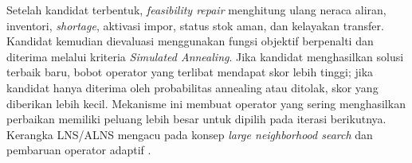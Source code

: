 \documentclass[journal]{IEEEtran}
\theoremstyle{definition}
\theoremstyle{definition}
\theoremstyle{plain}
\begin{document}
    \begin{table}[H]
    \centering
    \caption{Ringkasan operator ALNS yang digunakan}
    \label{tab:operator_summary}
    \end{table}

    Setelah kandidat terbentuk, \textit{feasibility repair} menghitung ulang neraca aliran, inventori, \textit{shortage}, aktivasi impor, status stok aman, dan kelayakan transfer. Kandidat kemudian dievaluasi menggunakan fungsi objektif berpenalti dan diterima melalui kriteria \textit{Simulated Annealing}. Jika kandidat menghasilkan solusi terbaik baru, bobot operator yang terlibat mendapat skor lebih tinggi; jika kandidat hanya diterima oleh probabilitas annealing atau ditolak, skor yang diberikan lebih kecil. Mekanisme ini membuat operator yang sering menghasilkan perbaikan memiliki peluang lebih besar untuk dipilih pada iterasi berikutnya. Kerangka LNS/ALNS mengacu pada konsep \textit{large neighborhood search} dan pembaruan operator adaptif \cite{pisinger2018lns,fathollahifard2023alns}.
\end{document}
